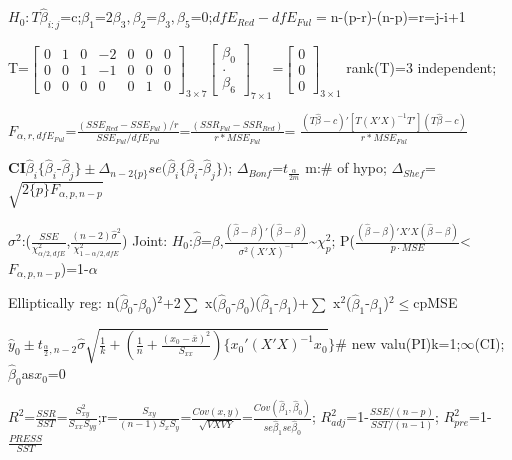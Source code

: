 \documentclass[
  10pt,
  twocolumn]{article}
\begin{document}
\(H_0:T\hat\beta_{i:j}\)=c;\(\beta_1\)=\(2\beta_3,\beta_2\)=\(\beta_3,\beta_5\)=0;\(dfE_{Red}-dfE_{Ful}=\)n-(p-r)-(n-p)=r=j-i+1

T=\(\begin{bmatrix} 0 & 1 & 0 & -2 & 0 & 0& 0 \\ 0 & 0 & 1 & -1 & 0 & 0 & 0\\ 0 & 0 & 0 & 0 & 0 & 1 & 0 \end{bmatrix}_{3\times7}\begin{bmatrix} \beta_0 \\ . \\ \beta_6 \end{bmatrix}_{7\times1}\)=\(\begin{bmatrix} 0 \\ 0 \\ 0\end{bmatrix}_{3\times1}\)
rank(T)=3 independent;

\(F_{\alpha,r,dfE_{Ful}}\)=\(\frac{(SSE_{Red}-SSE_{Ful})/r}{SSE_{Ful}/dfE_{Ful}}\)=\(\frac{(SSR_{Ful}-SSR_{Red})}{r*MSE_{Ful}}\)=
\(\frac{(T\hat\beta-c)'[T(X'X)^{-1}T'](T\hat\beta-c)}{r*MSE_{Ful}}\)

\dotfill

\textbf{CI}\(\hat\beta_i\{\hat\beta_i\)-\(\hat\beta_j\}\pm \Delta_{n-2\{p\}} se(\hat\beta_i\{\hat\beta_i\)-\(\hat\beta_j\})\);
\(\Delta_{Bonf}\)=\(t_{\frac{\alpha}{2m}}\) m:\# of hypo;
\(\Delta_{Shef}\)=\(\sqrt{2\{p\}F_{\alpha,p,n-p}}\)

\(\sigma^2\):(\(\frac{SSE}{\chi^2_{\alpha/2,dfE}}\),\(\frac{(n-2)\hat\sigma^2}{\chi^2_{1-\alpha/2,dfE}}\))
Joint:
\(H_0\):\(\hat\beta\)=\(\beta\),\(\frac{(\hat\beta-\beta)'(\hat\beta-\beta)}{\sigma^2(X'X)^{-1}}\)\textasciitilde{}\(\chi^2_{p}\);
P(\(\frac{(\hat\beta-\beta)'X'X(\hat\beta-\beta)}{p\cdot MSE}\)\textless{}\(F_{\alpha,p,n-p}\))=1-\(\alpha\)

Elliptically reg: n(\(\hat\beta_0\)-\(\beta_0\))\(^2\)+2\(\sum\)
x(\(\hat\beta_0\)-\(\beta_0\))(\(\hat\beta_1\)-\(\beta_1\))+\(\sum\)
x\(^2\)(\(\hat\beta_1\)-\(\beta_1\))\(^2\le\)cpMSE

\(\hat y_0\pm t_{\frac{\alpha}{2},n-2}\hat\sigma\sqrt{\frac1k+(\frac1n+\frac{(x_0-\bar x)^2}{S_{xx}})\{x_0'(X'X)^{-1}x_0}\}\)\#
new valu(PI)k=1;\(\infty\)(CI);\(\hat\beta_0\)as\(x_0\)=0

\dotfill

\(R^2\)=\(\frac{SSR}{SST}\)=\(\frac{S_{xy}^2}{S_{xx}S_{yy}}\);r=\(\frac{S_{xy}}{(n-1)S_{x}S_{y}}\)=\(\frac{Cov(x,y)}{\sqrt{VXVY}}\)=\(\frac{Cov(\hat\beta_1,\hat\beta_0)}{se\hat\beta_1se\hat\beta_0}\);
\(R^2_{adj}\)=1-\(\frac{SSE/(n-p)}{SST/(n-1)}\);
\(R^2_{pre}\)=1-\(\frac{PRESS}{SST}\)
\end{document}
